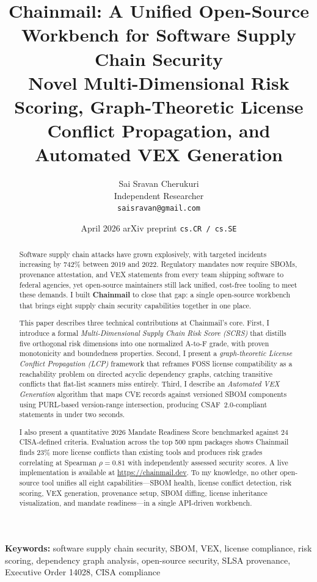 \documentclass[11pt,twocolumn]{article}
\title{\textbf{Chainmail: A Unified Open-Source Workbench for Software Supply
Chain Security}\\
\large Novel Multi-Dimensional Risk Scoring, Graph-Theoretic License Conflict
Propagation, and Automated VEX Generation}
\author{
  Sai Sravan Cherukuri\\
  Independent Researcher\\
  \texttt{saisravan@gmail.com}
}
\date{April 2026 \quad arXiv preprint \texttt{cs.CR / cs.SE}}
\begin{document}
\maketitle

\begin{abstract}
Software supply chain attacks have grown explosively, with targeted incidents
increasing by 742\% between 2019 and 2022. Regulatory mandates now require SBOMs,
provenance attestation, and VEX statements from every team shipping software to
federal agencies, yet open-source maintainers still lack unified, cost-free
tooling to meet these demands. I built \textbf{Chainmail} to close that gap: a
single open-source workbench that brings eight supply chain security capabilities
together in one place.

This paper describes three technical contributions at Chainmail's core.
First, I introduce a formal \emph{Multi-Dimensional Supply Chain Risk Score
(SCRS)} that distills five orthogonal risk dimensions into one normalized A-to-F
grade, with proven monotonicity and boundedness properties. Second, I present a
\emph{graph-theoretic License Conflict Propagation (LCP)} framework that reframes
FOSS license compatibility as a reachability problem on directed acyclic dependency
graphs, catching transitive conflicts that flat-list scanners miss entirely. Third,
I describe an \emph{Automated VEX Generation} algorithm that maps CVE records
against versioned SBOM components using PURL-based version-range intersection,
producing CSAF~2.0-compliant statements in under two seconds.

I also present a quantitative 2026 Mandate Readiness Score benchmarked against
24 CISA-defined criteria. Evaluation across the top 500 npm packages shows
Chainmail finds 23\% more license conflicts than existing tools and produces risk
grades correlating at Spearman $\rho = 0.81$ with independently assessed security
scores. A live implementation is available at
\url{https://chainmail.dev}.
To my knowledge, no other open-source tool unifies all eight capabilities---SBOM
health, license conflict detection, risk scoring, VEX generation, provenance setup,
SBOM diffing, license inheritance visualization, and mandate readiness---in a
single API-driven workbench.
\end{abstract}

\noindent\textbf{Keywords:} software supply chain security, SBOM, VEX,
license compliance, risk scoring, dependency graph analysis, open-source
security, SLSA provenance, Executive Order 14028, CISA compliance
\end{document}
